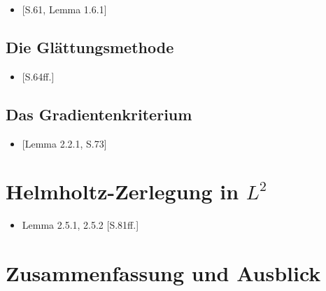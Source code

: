 \begin{itemize}
  \item \cite{sohr2001navier}[S.61, Lemma 1.6.1]
\end{itemize}


\section{Die Glättungsmethode}

\begin{itemize}
  \item \cite{sohr2001navier}[S.64ff.]
\end{itemize}

\section{Das Gradientenkriterium}

\begin{itemize}
  \item \cite{sohr2001navier}[Lemma 2.2.1, S.73]
\end{itemize}

\chapter{Helmholtz-Zerlegung in $L^2$}

\begin{itemize}
  \item Lemma 2.5.1, 2.5.2 \cite{sohr2001navier}[S.81ff.]
\end{itemize}

\chapter{Zusammenfassung und Ausblick}
